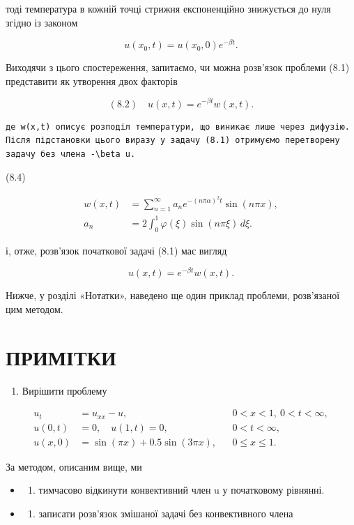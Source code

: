 \documentclass[
  ukrainian,
]{article}
\providecommand{\tightlist}{%
  \setlength{\itemsep}{0pt}\setlength{\parskip}{0pt}}
\begin{document}
тоді температура в кожній точці стрижня експоненційно знижується до нуля
згідно із законом

\[
u(x_0,t)=u(x_0,0)e^{-\beta t}.
\]

Виходячи з цього спостереження, запитаємо, чи можна розв'язок проблеми
(8.1) представити як утворення двох факторів

\[
(8.2)\quad u(x,t)=e^{-\beta t}w(x,t).
\]

\begin{verbatim}
де w(x,t) описує розподіл температури, що виникає лише через дифузію. Після підстановки цього виразу у задачу (8.1) отримуємо перетворену задачу без члена -\beta u.
\end{verbatim}

(8.4)

\[
\begin{aligned}
w(x,t)&=\sum_{n=1}^{\infty} a_n e^{-(n\pi\alpha)^2 t}\sin(n\pi x),\\
a_n&=2\int_0^1 \varphi(\xi)\sin(n\pi \xi)\,d\xi.
\end{aligned}
\]

і, отже, розв'язок початкової задачі (8.1) має вигляд

\[
u(x, t) = e^{-\beta t}w(x, t).
\]

Нижче, у розділі «Нотатки», наведено ще один приклад проблеми,
розв'язаної цим методом.

\section{ПРИМІТКИ}\label{ux43fux440ux438ux43cux456ux442ux43aux438}

\begin{enumerate}
\def\labelenumi{\arabic{enumi}.}
\tightlist
\item
  Вирішити проблему
\end{enumerate}

\[
\begin{aligned}
u_t &= u_{xx} - u, && 0 < x < 1,\ 0 < t < \infty, \\
u(0,t) &= 0,\quad u(1,t) = 0, && 0 < t < \infty, \\
u(x,0) &= \sin(\pi x) + 0.5\sin(3\pi x), && 0 \leqslant x \leqslant 1.
\end{aligned}
\]

За методом, описаним вище, ми

\begin{itemize}
\tightlist
\item
  \begin{enumerate}
  \def\labelenumi{\alph{enumi})}
  \tightlist
  \item
    тимчасово відкинути конвективний член u у початковому рівнянні.
  \end{enumerate}
\item
  \begin{enumerate}
  \def\labelenumi{\alph{enumi})}
  \setcounter{enumi}{1}
  \tightlist
  \item
    записати розв'язок змішаної задачі без конвективного члена
  \end{enumerate}
\end{itemize}
\end{document}
